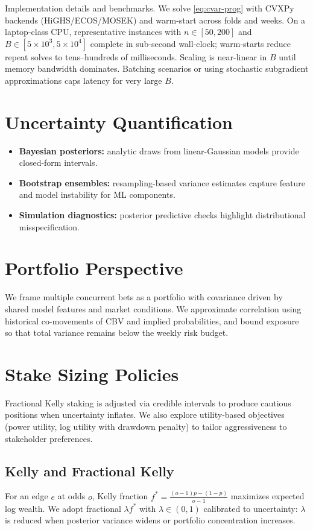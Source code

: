 Implementation details and benchmarks. We solve \eqref{eq:cvar-prog} with CVXPy backends (HiGHS/ECOS/MOSEK) and warm-start across folds and weeks. On a laptop-class CPU, representative instances with $n\in[50,200]$ and $B\in[5\times10^3,5\times10^4]$ complete in sub-second wall-clock; warm-starts reduce repeat solves to tens–hundreds of milliseconds. Scaling is near-linear in $B$ until memory bandwidth dominates. Batching scenarios or using stochastic subgradient approximations caps latency for very large $B$.

\section{Uncertainty Quantification}
\begin{itemize}
  \item \textbf{Bayesian posteriors:} analytic draws from linear-Gaussian models provide closed-form intervals.
  \item \textbf{Bootstrap ensembles:} resampling-based variance estimates capture feature and model instability for ML components.
  \item \textbf{Simulation diagnostics:} posterior predictive checks highlight distributional misspecification.
\end{itemize}

\section{Portfolio Perspective}
We frame multiple concurrent bets as a portfolio with covariance driven by shared model features and market conditions. We approximate correlation using historical co-movements of CBV and implied probabilities, and bound exposure so that total variance remains below the weekly risk budget.

\section{Stake Sizing Policies}
Fractional Kelly staking is adjusted via credible intervals to produce cautious positions when uncertainty inflates. We also explore utility-based objectives (power utility, log utility with drawdown penalty) to tailor aggressiveness to stakeholder preferences.

\subsection{Kelly and Fractional Kelly}
For an edge \(e\) at odds \(o\), Kelly fraction \(f^* = \frac{(o-1)p - (1-p)}{o-1}\) maximizes expected log wealth. We adopt fractional \(\lambda f^*\) with \(\lambda \in (0,1)\) calibrated to uncertainty: \(\lambda\) is reduced when posterior variance widens or portfolio concentration increases.

